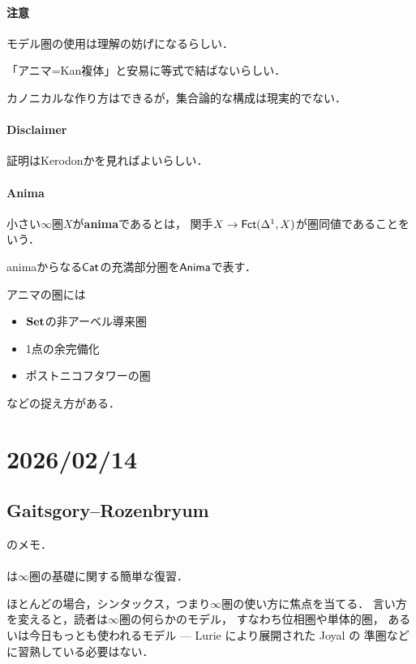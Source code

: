 \paragraph{注意}
モデル圏の使用は理解の妨げになるらしい．

「アニマ=Kan複体」と安易に等式で結ばないらしい．

カノニカルな作り方はできるが，集合論的な構成は現実的でない．

\paragraph{ Disclaimer}
証明はKerodonか\cite{HTT}を見ればよいらしい．

\paragraph{ Anima}
\begin{DFN}
    小さい\(\infty\)圏\(X\)が\textbf{anima}であるとは，
    関手\(X\to\mathop{\mathsf{Fct}}\nolimits(\Delta^{1},X)\)が圏同値であることをいう．

    animaからなる\(\mathsf{Cat}\)の充満部分圏を\(\mathsf{Anima}\)で表す．
\end{DFN}

アニマの圏には
\begin{itemize}
    \item \({\bf Set}\)の非アーベル導来圏
    \item 1点の余完備化
    \item ポストニコフタワーの圏
\end{itemize}
などの捉え方がある．

\section{2026/02/14}
\subsection{Gaitsgory--Rozenbryum}
\cite{GR17}のメモ．

\paragraph{}
\cite[Sect. 1,2]{GR17}は\(\infty\)圏の基礎に関する簡単な復習．

ほとんどの場合，シンタックス，つまり\(\infty\)圏の使い方に焦点を当てる．
言い方を変えると，読者は\(\infty\)圏の何らかのモデル，
すなわち位相圏や単体的圏，
あるいは今日もっとも使われるモデル --- Lurie により展開された Joyal の
準圏などに習熟している必要はない．

